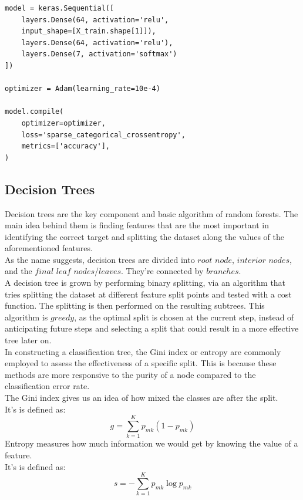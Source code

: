 \documentclass[letterpaper,12pt]{article}
\begin{document}
\begin{lstlisting}
model = keras.Sequential([
    layers.Dense(64, activation='relu',
    input_shape=[X_train.shape[1]]),
    layers.Dense(64, activation='relu'),
    layers.Dense(7, activation='softmax')
])

optimizer = Adam(learning_rate=10e-4)

model.compile(
    optimizer=optimizer,
    loss='sparse_categorical_crossentropy',
    metrics=['accuracy'],
)

\end{lstlisting}


\subsection{Decision Trees}
Decision trees are the key component and basic algorithm of random forests. The main idea behind them is finding features that are the most important in identifying the correct target and splitting the dataset along the values of the aforementioned features.\\
As the name suggests, decision trees are divided into $root$ $node$, $interior$ $nodes$, and the $final$ $leaf$ $nodes$/$leaves$. They're connected by $branches$.\\
A decision tree is grown by performing binary splitting, via an algorithm that tries splitting the dataset at different feature split points and tested with a cost function. The splitting is then performed on the resulting subtrees. This algorithm is $greedy$, as the optimal split is chosen at the current step, instead of anticipating future steps and selecting a split that could result in a more effective tree later on.\\
In constructing a classification tree, the Gini index or entropy are commonly employed to assess the effectiveness of a specific split. This is because these methods are more responsive to the purity of a node compared to the classification error rate.\\
The Gini index gives us an idea of how mixed the classes are after the split.\\
It's is defined as:
    \begin{equation}
        g = \sum_{k=1}^K p_{mk}(1-p_{mk})
    \end{equation}
Entropy measures how much information we would get by knowing the value of a feature.\\
It's is defined as:
    \begin{equation}
        s = -\sum_{k=1}^K p_{mk}\log{p_{mk}}
    \end{equation}
\end{document}
